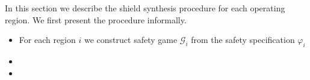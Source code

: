 In this section we describe the shield synthesis procedure for each operating region. We first present the procedure informally.
\begin{itemize}
    \item For each region $i$ we construct safety game $\mathcal{G}_i$ from the safety specification $\varphi_i$
    \item {}
    \item {}
\end{itemize}